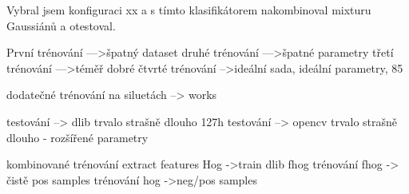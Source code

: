 Vybral jsem konfiguraci xx a s tímto klasifikátorem nakombinoval mixturu Gaussiánů a otestoval.






 První trénování --->špatný dataset
 druhé trénování --->špatné parametry
 třetí trénování --->téměř dobré
 čtvrté trénování -->ideální sada, ideální parametry, 85%
 
 dodatečné trénování na siluetách --> works


 testování --> dlib trvalo strašně dlouho 127h
 testování --> opencv trvalo strašně dlouho - rozšířené parametry


 kombinované trénování  extract features Hog  ->train dlib fhog
 trénování fhog -> čistě pos samples
 trénování hog ->neg/pos samples

